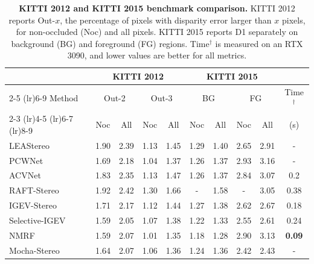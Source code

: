 \begin{table}[!t]
	\small
	\centering
	\caption{\textbf{KITTI 2012 and KITTI 2015 benchmark comparison.}
	KITTI 2012 reports Out-$x$, the percentage of pixels with disparity error larger than $x$ pixels, for non-occluded (Noc) and all pixels.
	KITTI 2015 reports D1 separately on background (BG) and foreground (FG) regions.
	Time$^\dag$ is measured on an RTX 3090, and lower values are better for all metrics.}
	\label{tab:dispvit_results_kitti}
	\vspace{6pt}
	\setlength{\tabcolsep}{8pt}
	\begin{tabular}{l c c c c c c c c c}
		
		\toprule
		& \multicolumn{4}{c}{KITTI 2012} & \multicolumn{4}{c}{KITTI 2015} &\\
		\cmidrule(lr){2-5}
		\cmidrule(lr){6-9}
		Method & \multicolumn{2}{c}{Out-2} & \multicolumn{2}{c}{Out-3}  
		& \multicolumn{2}{c}{BG} & \multicolumn{2}{c}{FG} & Time$^\dag$\\
		\cmidrule(lr){2-3}
		\cmidrule(lr){4-5}
		\cmidrule(lr){6-7}
		\cmidrule(lr){8-9}
		& Noc &  All &  Noc &  All & Noc & All & Noc & All & (s) \\
		\hline
		
		LEAStereo & 1.90 & 2.39 & 1.13 & 1.45 & 1.29 & 1.40 & 2.65 & 2.91 & -\\
		PCWNet & 1.69 & 2.18 & 1.04 & 1.37 & 1.26 & 1.37 & 2.93 & 3.16 & -\\
		ACVNet & 1.83 & 2.35 & 1.13 & 1.47 & 1.26 & 1.37 & 2.84 & 3.07 & 0.2\\
		RAFT-Stereo & 1.92 & 2.42 & 1.30 & 1.66 & - & 1.58 & - & 3.05  & 0.38\\
		IGEV-Stereo & 1.71 & 2.17 & 1.12 & 1.44 & 1.27 & 1.38 & 2.62 & 2.67 & 0.18\\
		Selective-IGEV & 1.59 & 2.05 & 1.07 & 1.38 & 1.22 & 1.33 & 2.55 & 2.61 & 0.24 \\
		NMRF & 1.59 & 2.07 & 1.01 & 1.35 & 1.18 & 1.28 & 2.90 & 3.13 & \textbf{0.09}\\
		Mocha-Stereo & 1.64 & 2.07 & 1.06 & 1.36 & 1.24 & 1.36 & 2.42 & 2.43 & - \\
		

\end{tabular}
\end{table}

